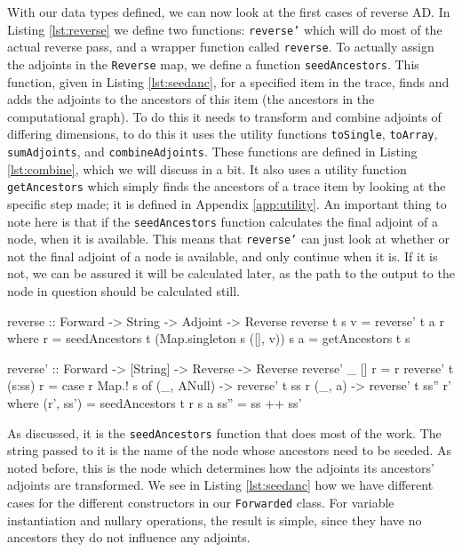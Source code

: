         With our data types defined, we can now look at the first cases of reverse AD.
        In Listing \ref{lst:reverse} we define two functions: \texttt{reverse'} which will do most of the actual reverse pass, and a wrapper function called \texttt{reverse}.
        To actually assign the adjoints in the \texttt{Reverse} map, we define a function \texttt{seedAncestors}.
        This function, given in Listing \ref{lst:seedanc}, for a specified item in the trace, finds and adds the adjoints to the ancestors of this item (the ancestors in the computational graph).
        To do this it needs to transform and combine adjoints of differing dimensions, to do this it uses the utility functions \texttt{toSingle}, \texttt{toArray}, \texttt{sumAdjoints}, and \texttt{combineAdjoints}.
        These functions are defined in Listing \ref{lst:combine}, which we will discuss in a bit.
        It also uses a utility function \texttt{getAncestors} which simply finds the ancestors of a trace item by looking at the specific step made; it is defined in Appendix \ref{app:utility}.
        An important thing to note here is that if the \texttt{seedAncestors} function calculates the final adjoint of a node, when it is available.
        This means that \texttt{reverse'} can just look at whether or not the final adjoint of a node is available, and only continue when it is.
        If it is not, we can be assured it will be calculated later, as the path to the output to the node in question should be calculated still. %
        
        \begin{haskell}[caption=Reverse pass function, label=lst:reverse, gobble=12]
            reverse :: Forward -> String -> Adjoint -> Reverse
            reverse t s v = reverse' t a r
                where
                    r = seedAncestors t (Map.singleton s ([], v)) s
                    a = getAncestors t s

            reverse' :: Forward -> [String] -> Reverse -> Reverse
            reverse' _ []     r = r
            reverse' t (s:ss) r = case r Map.! s of
                (_, ANull) -> reverse' t ss r
                (_, a)     -> reverse' t ss'' r'
                where
                    (r', ss') = seedAncestors t r s a
                    ss''      = ss ++ ss'
        \end{haskell}

        As discussed, it is the \texttt{seedAncestors} function that does most of the work.
        The string passed to it is the name of the node whose ancestors need to be seeded.
        As noted before, this is the node which determines how the adjoints its ancestors' adjoints are transformed.
        We see in Listing \ref{lst:seedanc} how we have different cases for the different constructors in our \texttt{Forwarded} class.
        For variable instantiation and nullary operations, the result is simple, since they have no ancestors they do not influence any adjoints.
        
